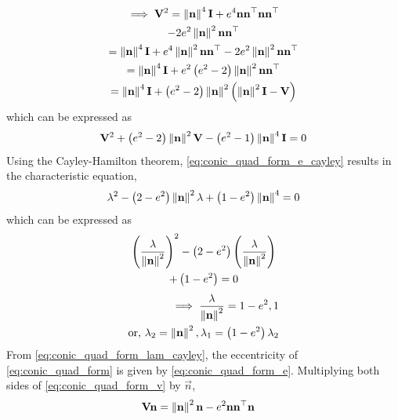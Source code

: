 \documentclass[journal,12pt,twocolumn]{IEEEtran}
\renewcommand\thesection{\arabic{section}}
\renewcommand\thesubsection{\thesection.\arabic{subsection}}
\begin{document}
\begin{enumerate}[label=\thesubsection.\arabic*.,ref=\thesubsection.\theenumi]
\begin{multline}
    \\
    \implies \mathbf{V}^{2} = \left\lVert\mathbf{n}\right\rVert^4\mathbf{I}+e^4\mathbf{n}\mathbf{n}^{\top}\mathbf{n}\mathbf{n}^{\top}
	  \\
	  -2e^2\left\lVert\mathbf{n}\right\rVert^2\mathbf{n}\mathbf{n}^{\top}
    \\
    = \left\lVert\mathbf{n}\right\rVert^4\mathbf{I} + e^4\left\lVert\mathbf{n}\right\rVert^2\mathbf{n}\mathbf{n}^{\top}
	  - 2e^2\left\lVert\mathbf{n}\right\rVert^2\mathbf{n}\mathbf{n}^{\top}
    \\
    = \left\lVert\mathbf{n}\right\rVert^4\mathbf{I} + e^2\left(e^2 - 2\right)\left\lVert\mathbf{n}\right\rVert^2\mathbf{n}\mathbf{n}^{\top}
    \\
    = \left\lVert\mathbf{n}\right\rVert^4\mathbf{I} + \left(e^2 - 2\right)\left\lVert\mathbf{n}\right\rVert^2\left(\left\lVert\mathbf{n}\right\rVert^2\mathbf{I}- \mathbf{V}\right)
    \end{multline}
%    
which can be expressed as
\begin{align}
  \mathbf{V}^{2} + \left(e^2 - 2\right)\left\lVert\mathbf{n}\right\rVert^2\mathbf{V} - \left(e^2 - 1\right)\left\lVert\mathbf{n}\right\rVert^4\mathbf{I}=0
  \label{eq:conic_quad_form_e_cayley}
\end{align}
Using the Cayley-Hamilton theorem, \eqref{eq:conic_quad_form_e_cayley} results in the characteristic equation, 
\begin{align}
  \lambda^{2} - \left(2-e^2\right)\left\lVert\mathbf{n}\right\rVert^2\lambda + \left(1-e^2 \right)\left\lVert\mathbf{n}\right\rVert^4=0
\end{align}
which can be expressed as
\begin{multline}
\left(\frac{\lambda}{\left\lVert\mathbf{n}\right\rVert^2}\right)^2 - \left(2-e^2 \right)\left(\frac{\lambda}{\left\lVert\mathbf{n}\right\rVert^2}\right) 
	\\
	+ \left(1-e^2 \right) = 0
\end{multline}
\begin{align}
  \implies \frac{\lambda}{\left\lVert\mathbf{n}\right\rVert^2} = 1-e^2, 1
  \\
  \text{or, }\lambda_2 = \left\lVert\mathbf{n}\right\rVert^2, \lambda_1 = \left(1-e^2\right)\lambda_2 
  \label{eq:conic_quad_form_lam_cayley}
\end{align}
From   \eqref{eq:conic_quad_form_lam_cayley}, the eccentricity of \eqref{eq:conic_quad_form} is given by 
\eqref{eq:conic_quad_form_e}.   
%
Multiplying both sides of    \eqref{eq:conic_quad_form_v} by $\vec{n}$,
\begin{align}
\vec{V} \vec{n}&=\norm{\vec{n}}^2\vec{n}-e^2\vec{n}\vec{n}^{\top}\vec{n} 

\end{align}
\end{enumerate}
\end{document}
